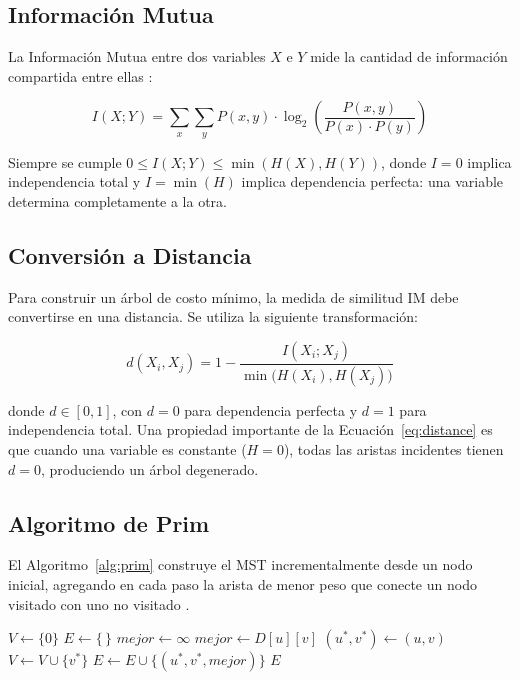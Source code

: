 \documentclass[12pt, a4paper]{article}
\begin{document}
\subsection{Información Mutua}

La Información Mutua entre dos variables $X$ e $Y$ mide la cantidad de
información compartida entre ellas \cite{cover2006}:

\begin{equation}\label{eq:mi}
    I(X;Y) = \sum_{x} \sum_{y} P(x,y) \cdot
    \log_2 \left( \frac{P(x,y)}{P(x) \cdot P(y)} \right)
\end{equation}

Siempre se cumple $0 \le I(X;Y) \le \min(H(X), H(Y))$, donde $I = 0$
implica independencia total y $I = \min(H)$ implica dependencia perfecta:
una variable determina completamente a la otra.

\subsection{Conversión a Distancia}

Para construir un árbol de costo mínimo, la medida de similitud IM debe
convertirse en una distancia. Se utiliza la siguiente transformación:

\begin{equation}\label{eq:distance}
    d(X_i, X_j) = 1 -
    \frac{I(X_i; X_j)}{\min\!\big(H(X_i), H(X_j)\big)}
\end{equation}

donde $d \in [0,1]$, con $d = 0$ para dependencia perfecta y $d = 1$
para independencia total. Una propiedad importante de la
Ecuación~\ref{eq:distance} es que cuando una variable es constante
($H = 0$), todas las aristas incidentes tienen $d = 0$, produciendo
un árbol degenerado.

\subsection{Algoritmo de Prim}

El Algoritmo~\ref{alg:prim} construye el MST incrementalmente desde
un nodo inicial, agregando en cada paso la arista de menor peso que
conecte un nodo visitado con uno no visitado \cite{prim1957}.

\begin{algorithm}[H]
\caption{Prim --- Árbol de Expansión Mínima}\label{alg:prim}
\begin{algorithmic}[1]
 
    \State $V \gets \{0\}$ 
    \State $E \gets \{\,\}$ 
        \State $mejor \gets \infty$
                    \State $mejor \gets D[u][v]$
                    \State $(u^*, v^*) \gets (u, v)$
                \EndIf
            \EndFor
        \EndFor
        \State $V \gets V \cup \{v^*\}$
        \State $E \gets E \cup \{(u^*, v^*, mejor)\}$
    \EndWhile
    \State \Return $E$
\EndFunction
\end{algorithmic}
\end{algorithm}
\end{document}
